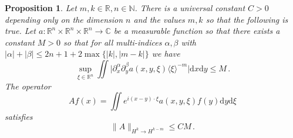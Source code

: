 \documentclass[11pt]{amsart}
\newtheorem{Proposition}[Theorem]{Proposition}
\theoremstyle{definition}
\numberwithin{equation}{section}
\newcommand{\mR}{\mathbb{R}}                    %
\newcommand{\abs}[1]{\lvert #1 \rvert}          %
\newcommand{\norm}[1]{\lVert #1 \rVert}         %
\begin{document}
\begin{Proposition}\label{prop:hbounded}
	Let $m,k \in \mR, n\in \mathbb{N}$. There is a universal constant $C>0$ depending only on the dimension $n$ and the values $m,k$ so that the following is true. Let $a \colon \mR^n\times\mR^n\times \mR^n \to \mathbb{C}$ be a measurable function so that there exists a constant $M>0$ so that for all multi-indices $\alpha,\beta$ with $\abs{\alpha}+\abs{\beta} \leq 2n+1+2\max\{\abs{k},\abs{m-k}\}$ we have
	\begin{equation}\label{eq:supa}
		\sup_{\xi\in\mR^n}\iint \abs{\partial_x^\alpha\partial_y^\beta a(x,y,\xi) \langle \xi \rangle^{-m}} \mathrm{d} x\mathrm{d} y \leq M\,.
	\end{equation}
	The operator
	\[
		Af(x) = \iint e^{i(x-y)\cdot\xi}a(x,y,\xi)f(y)\mathrm{d} y\mathrm{d}\xi
	\]
	satisfies
	\[
		\norm{A}_{H^{k}\to H^{k-m}} \leq C M\,.
	\]
\end{Proposition}
\end{document}
